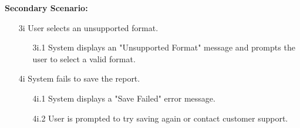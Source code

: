 \documentclass[]{article}
\begin{document}
\begin{enumerate}[{\bf BE1.}]
\textbf{Secondary Scenario:}
\begin{enumerate}
    \item[3i] User selects an unsupported format.
    \begin{enumerate}
        \item[3i.1] System displays an "Unsupported Format" message and prompts the user to select a valid format.
    \end{enumerate}
    \item[4i] System fails to save the report.
    \begin{enumerate}
        \item[4i.1] System displays a "Save Failed" error message.
        \item[4i.2] User is prompted to try saving again or contact customer support.
    \end{enumerate}
\end{enumerate}

    

\end{enumerate}
\end{document}
